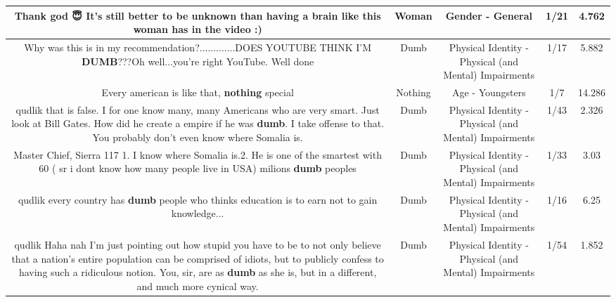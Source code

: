 \documentclass[11pt]{article}
\newlength\mylength
\begin{document}
\begin{center}
\begin{longtable}{|C{.65\mylength}|C{.30\mylength}|C{.12\mylength}|C{.12\mylength}|C{.12\mylength}|}
  \small Thank god 😇 It's still better to be unknown than having a brain like this \textbf{woman} has in the video :)\normalsize   & Woman & Gender - General & 1/21 & 4.762 \\  \hline
  \small Why was this is in my recommendation?.............DOES YOUTUBE THINK I'M \textbf{DUMB}???Oh well...you're right YouTube. Well done\normalsize   & Dumb & Physical Identity - Physical (and Mental) Impairments & 1/17 & 5.882 \\  \hline
  \small Every american is like that, \textbf{nothing} special\normalsize   & Nothing & Age - Youngsters & 1/7 & 14.286 \\  \hline
  \small qudlik that is false. I for one know many, many Americans who are very smart. Just look at Bill Gates. How did he create a empire if he was \textbf{dumb}. I take offense to that. You probably don't even know where Somalia is.\normalsize   & Dumb & Physical Identity - Physical (and Mental) Impairments & 1/43 & 2.326 \\  \hline
  \small Master Chief, Sierra 117  1. I know where Somalia is.2. He is one of the smartest with 60 ( sr i dont know how many people live in USA) milions \textbf{dumb} peoples\normalsize   & Dumb & Physical Identity - Physical (and Mental) Impairments & 1/33 & 3.03 \\  \hline
  \small qudlik every country has \textbf{dumb} people who thinks education is to earn not to gain knowledge...\normalsize   & Dumb & Physical Identity - Physical (and Mental) Impairments & 1/16 & 6.25 \\  \hline
  \small qudlik Haha nah I'm just pointing out how stupid you have to be to not only believe that a nation's entire population can be comprised of idiots, but to publicly confess to having such a ridiculous notion. You, sir, are as \textbf{dumb} as she is, but in a different, and much more cynical way.\normalsize   & Dumb & Physical Identity - Physical (and Mental) Impairments & 1/54 & 1.852 \\  \hline

\end{longtable}
\end{center}
\end{document}
